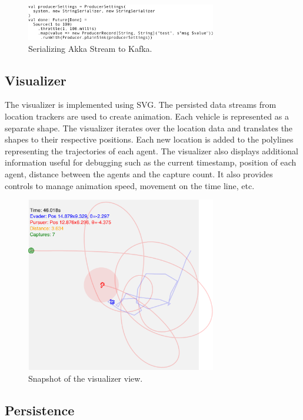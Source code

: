 \documentclass{article}
\begin{document}
\begin{figure}
	\centering
	\includegraphics[width=8.3cm]{kafka-sink}
	\caption{Serializing Akka Stream to Kafka.}\label{fig:kafka-sink}
\end{figure}

\subsection{Visualizer}

The visualizer is implemented using SVG. The persisted data streams from location trackers are used to create animation. Each vehicle is represented as a separate shape. The visualizer iterates over the location data and translates the shapes to their respective positions. Each new location is added to the polylines representing the trajectories of each agent. The visualizer also displays additional information useful for debugging such as the current timestamp, position of each agent, distance between the agents and the capture count.
It also provides controls to manage animation speed, movement on the time line, etc.

\begin{figure}
	\centering
	\includegraphics[width=8.3cm]{visualizer}
	\caption{Snapshot of the visualizer view.}\label{fig:visualizer}
\end{figure}


\subsection{Persistence}
\end{document}
